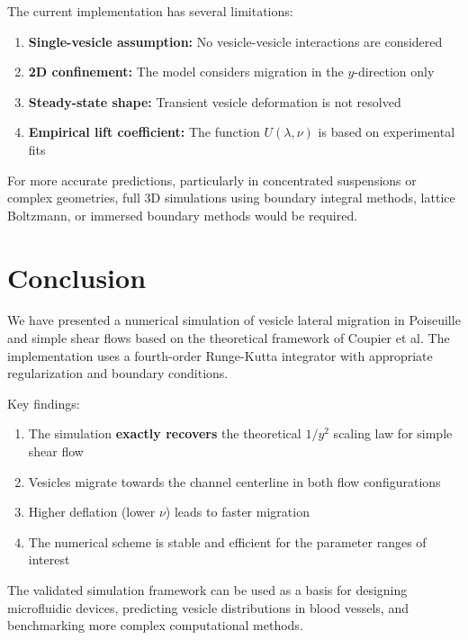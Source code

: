 \documentclass{article}
\begin{document}
The current implementation has several limitations:
\begin{enumerate}
    \item \textbf{Single-vesicle assumption:} No vesicle-vesicle interactions are considered
    \item \textbf{2D confinement:} The model considers migration in the $y$-direction only
    \item \textbf{Steady-state shape:} Transient vesicle deformation is not resolved
    \item \textbf{Empirical lift coefficient:} The function $U(\lambda, \nu)$ is based on experimental fits
\end{enumerate}

For more accurate predictions, particularly in concentrated suspensions or complex geometries, full 3D simulations using boundary integral methods, lattice Boltzmann, or immersed boundary methods would be required.

\section{Conclusion}

We have presented a numerical simulation of vesicle lateral migration in Poiseuille and simple shear flows based on the theoretical framework of Coupier et al. The implementation uses a fourth-order Runge-Kutta integrator with appropriate regularization and boundary conditions.

Key findings:
\begin{enumerate}
    \item The simulation \textbf{exactly recovers} the theoretical $1/y^2$ scaling law for simple shear flow
    \item Vesicles migrate towards the channel centerline in both flow configurations
    \item Higher deflation (lower $\nu$) leads to faster migration
    \item The numerical scheme is stable and efficient for the parameter ranges of interest
\end{enumerate}

The validated simulation framework can be used as a basis for designing microfluidic devices, predicting vesicle distributions in blood vessels, and benchmarking more complex computational methods.

\printbibliography 
\end{document}
